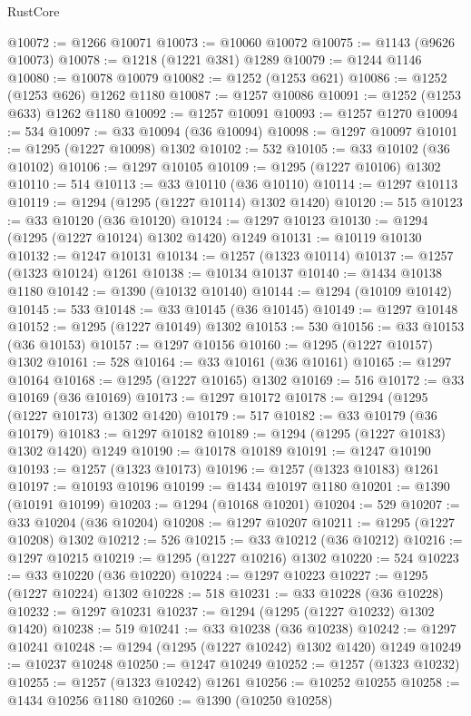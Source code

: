 \begin{lexlean}{RustCore}
\begin{coremodule}
@10072 := @1266 @10071
@10073 := @10060 @10072
@10075 := @1143 (@9626 @10073)
@10078 := @1218 (@1221 @381) @1289
@10079 := @1244 @1146
@10080 := @10078 @10079
@10082 := @1252 (@1253 @621)
@10086 := @1252 (@1253 @626) @1262 @1180
@10087 := @1257 @10086
@10091 := @1252 (@1253 @633) @1262 @1180
@10092 := @1257 @10091
@10093 := @1257 @1270
@10094 := 534
@10097 := @33 @10094 (@36 @10094)
@10098 := @1297 @10097
@10101 := @1295 (@1227 @10098) @1302
@10102 := 532
@10105 := @33 @10102 (@36 @10102)
@10106 := @1297 @10105
@10109 := @1295 (@1227 @10106) @1302
@10110 := 514
@10113 := @33 @10110 (@36 @10110)
@10114 := @1297 @10113
@10119 := @1294 (@1295 (@1227 @10114) @1302 @1420)
@10120 := 515
@10123 := @33 @10120 (@36 @10120)
@10124 := @1297 @10123
@10130 := @1294 (@1295 (@1227 @10124) @1302 @1420) @1249
@10131 := @10119 @10130
@10132 := @1247 @10131
@10134 := @1257 (@1323 @10114)
@10137 := @1257 (@1323 @10124) @1261
@10138 := @10134 @10137
@10140 := @1434 @10138 @1180
@10142 := @1390 (@10132 @10140)
@10144 := @1294 (@10109 @10142)
@10145 := 533
@10148 := @33 @10145 (@36 @10145)
@10149 := @1297 @10148
@10152 := @1295 (@1227 @10149) @1302
@10153 := 530
@10156 := @33 @10153 (@36 @10153)
@10157 := @1297 @10156
@10160 := @1295 (@1227 @10157) @1302
@10161 := 528
@10164 := @33 @10161 (@36 @10161)
@10165 := @1297 @10164
@10168 := @1295 (@1227 @10165) @1302
@10169 := 516
@10172 := @33 @10169 (@36 @10169)
@10173 := @1297 @10172
@10178 := @1294 (@1295 (@1227 @10173) @1302 @1420)
@10179 := 517
@10182 := @33 @10179 (@36 @10179)
@10183 := @1297 @10182
@10189 := @1294 (@1295 (@1227 @10183) @1302 @1420) @1249
@10190 := @10178 @10189
@10191 := @1247 @10190
@10193 := @1257 (@1323 @10173)
@10196 := @1257 (@1323 @10183) @1261
@10197 := @10193 @10196
@10199 := @1434 @10197 @1180
@10201 := @1390 (@10191 @10199)
@10203 := @1294 (@10168 @10201)
@10204 := 529
@10207 := @33 @10204 (@36 @10204)
@10208 := @1297 @10207
@10211 := @1295 (@1227 @10208) @1302
@10212 := 526
@10215 := @33 @10212 (@36 @10212)
@10216 := @1297 @10215
@10219 := @1295 (@1227 @10216) @1302
@10220 := 524
@10223 := @33 @10220 (@36 @10220)
@10224 := @1297 @10223
@10227 := @1295 (@1227 @10224) @1302
@10228 := 518
@10231 := @33 @10228 (@36 @10228)
@10232 := @1297 @10231
@10237 := @1294 (@1295 (@1227 @10232) @1302 @1420)
@10238 := 519
@10241 := @33 @10238 (@36 @10238)
@10242 := @1297 @10241
@10248 := @1294 (@1295 (@1227 @10242) @1302 @1420) @1249
@10249 := @10237 @10248
@10250 := @1247 @10249
@10252 := @1257 (@1323 @10232)
@10255 := @1257 (@1323 @10242) @1261
@10256 := @10252 @10255
@10258 := @1434 @10256 @1180
@10260 := @1390 (@10250 @10258)

\end{coremodule}
\end{lexlean}
